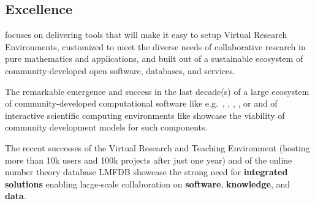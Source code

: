 \documentclass[noworkareas,deliverables,gitinfo,compactht]{euproposal}
\begin{document}
\begin{proposal}[
  site=PS,PSRM=48,
  site=LL,LLRM=48,
  site=UV,UVRM=48,
  site=UJF,UJFRM=48,
  site=UB,UBRM=48,
  site=UO,UORM=48,
  site=USH,USHRM=48,
  site=USO,USORM=48,
  site=SA,SARM=48,
  site=UW,UWRM=48,
  site=JU,JURM=48,
  site=UK,UKRM=48,
  site=US,USRM=48,
  site=ZH,ZHRM=48,
  site=SR,SRRM=48,
  site=UWS,UWSRM=48,
  coordinator=miko,
  acronym={DreamKit},
  acrolong={\underline{D}igital \underline{r}esearch \underline{e}nvironment for \underline{a}* \underline{m}athematics, as a \underline{kit}},
  title=\pn: \protect\pnlong,
  callname=ICT Call 1,
  callid=FP7-???-200?-?,
  instrument= Small or Medium-Scale Focused Research Project (STREP), 
  challengeid = 4,
  challenge = ICT for EU Proposals,
  objectiveid={ICT-2012.4.4}, 
  objective = Technology-enhanced Documents,
  outcomeid = b1,
  outcome = {More time for Research, not Proposal writing},
  coordinator=miko,
  months=48,
  compactht]
\newcommand{\TheProject}{\pn}%

\begin{abstract}
\end{abstract}
\tableofcontents

%


\section{Excellence}

\TheProject focuses on delivering tools that will make it easy to setup Virtual Research
Environments, customized to meet the diverse needs of collaborative
research in pure mathematics and applications, and built out of a
sustainable ecosystem of %
community-developed open software, databases, and services.

The remarkable emergence and success in the last decade(s) of a large
ecosystem of community-developed computational software like
e.g.\ \GAP, \Linbox, \PariGP, \Sage, or \Singular and of interactive
scientific computing environments like \IPython showcase the viability
of community development models for such components.

The recent successes of the Virtual Research and Teaching Environment
\SMC (hosting more than 10k users and 100k projects after just
one year) and of the online number theory database LMFDB showcase the
strong need for \textbf{integrated solutions} enabling large-scale
collaboration on \textbf{software}, \textbf{knowledge}, and \textbf{data}.


\end{proposal}
\end{document}
